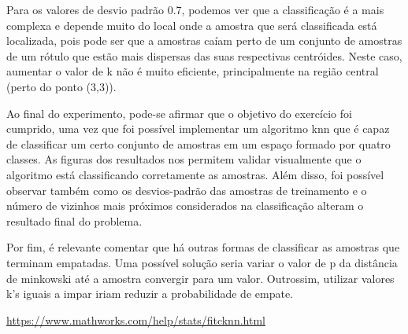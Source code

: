 \documentclass[12pt]{article}
\begin{document}
  \par Para os valores de desvio padrão 0.7, podemos ver que a classificação é a mais complexa e depende muito do local onde a amostra que será classificada está localizada, pois pode ser que a amostras caíam perto de um conjunto de amostras de um rótulo que estão mais dispersas das suas respectivas centróides. Neste caso, aumentar o valor de k não é muito eficiente, principalmente na região central (perto do ponto (3,3)).
  
  \par Ao final do experimento, pode-se afirmar que o objetivo do exercício foi cumprido, uma vez que foi possível implementar um algoritmo knn que é capaz de classificar um certo conjunto de amostras em um espaço formado por quatro classes. As figuras dos resultados nos permitem validar visualmente que o algoritmo está classificando corretamente as amostras. Além disso, foi possível observar também como os desvios-padrão das amostras de treinamento e o número de vizinhos mais próximos considerados na classificação alteram o resultado final do problema.
  \par Por fim, é relevante comentar que há outras formas de classificar as amostras que terminam empatadas. Uma possível solução seria variar o valor de p da distância de minkowski até a amostra convergir para um valor. Outrossim, utilizar valores k's iguais a impar iriam reduzir a probabilidade de empate. 



\begin{thebibliography}{99}
		\label{matlab} \url{https://www.mathworks.com/help/stats/fitcknn.html}
\end{thebibliography}	
\end{document}
